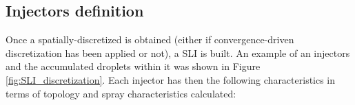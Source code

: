 %
%
%
%	
%	
%	
%	
%		
%	
%



\subsection{Injectors definition}
\label{subsec:ch4_injectors_definition}

Once a spatially-discretized is obtained (either if convergence-driven discretization has been applied or not), a SLI is built. An example of an injectors and the accumulated droplets within it was shown in Figure \ref{fig:SLI_discretization}. Each injector has then the following characteristics in terms of topology and spray characteristics calculated:

